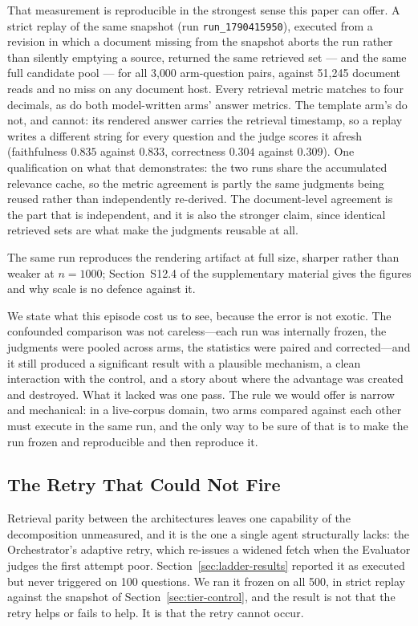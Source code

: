 \documentclass[acmsmall,review,anonymous,screen]{acmart}
\begin{document}
That measurement is reproducible in the strongest sense this paper can offer. A
strict replay of the same snapshot (run \texttt{run\_1790415950}), executed from
a revision in which a document missing from the snapshot aborts the run rather
than silently emptying a source, returned the same retrieved set --- and the same
full candidate pool --- for all 3{,}000 arm-question pairs, against 51{,}245
document reads and no miss on any document host. Every retrieval metric matches
to four decimals, as do both model-written arms' answer metrics. The template
arm's do not, and cannot: its rendered answer carries the retrieval timestamp,
so a replay writes a different string for every question and the judge scores it
afresh (faithfulness $0.835$ against $0.833$, correctness $0.304$ against
$0.309$). One qualification on what that
demonstrates: the two runs share the accumulated relevance cache, so the metric
agreement is partly the same judgments being reused rather than independently
re-derived. The document-level agreement is the part that is independent, and it
is also the stronger claim, since identical retrieved sets are what make the
judgments reusable at all.

The same run reproduces the rendering artifact at full size, sharper rather than
weaker at $n=1000$; Section~S12.4 of the supplementary material gives the figures
and why scale is no defence against it.

We state what this episode cost us to see, because the error is not exotic. The
confounded comparison was not careless---each run was internally frozen, the
judgments were pooled across arms, the statistics were paired and
corrected---and it still produced a significant result with a plausible
mechanism, a clean interaction with the control, and a story about where the
advantage was created and destroyed. What it lacked was one pass. The rule we
would offer is narrow and mechanical: in a live-corpus domain, two arms
compared against each other must execute in the same run, and the only way to
be sure of that is to make the run frozen and reproducible and then reproduce
it.

\subsection{The Retry That Could Not Fire}\label{sec:retry}

Retrieval parity between the architectures leaves one capability of the
decomposition unmeasured, and it is the one a single agent structurally lacks:
the Orchestrator's adaptive retry, which re-issues a widened fetch when the
Evaluator judges the first attempt poor. Section~\ref{sec:ladder-results}
reported it as executed but never triggered on 100 questions. We ran it frozen
on all 500, in strict replay against the snapshot of
Section~\ref{sec:tier-control}, and the result is not that the retry helps or
fails to help. It is that the retry cannot occur.
\end{document}
